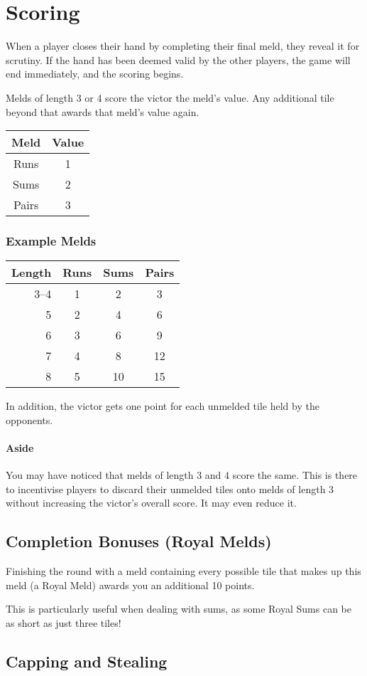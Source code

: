 \section{Scoring}\label{sec:scoring}
When a player closes their hand by completing their final meld, they reveal it for scrutiny. 
If the hand has been deemed valid by the other players, the game will end immediately, and the scoring begins.

Melds of length 3 or 4 score the victor the meld's value. Any additional tile beyond that awards that meld's value again.

\begin{center}
    \begin{tabular}{c|c}
        Meld & Value\\\hline\hline
        Runs & 1\\
        Sums & 2\\
        Pairs & 3\\
    \end{tabular}
\end{center}

\subsubsection*{Example Melds}
\begin{center}
    \begin{tabular}{r|c|c|c}
        Length & Runs & Sums & Pairs\\\hline\hline
        3--4 & 1 &  2 &  3 \\
           5 & 2 &  4 &  6 \\
           6 & 3 &  6 &  9 \\
           7 & 4 &  8 & 12 \\
           8 & 5 & 10 & 15 \\
    \end{tabular}
\end{center}

In addition, the victor gets one point for each unmelded tile held by the opponents.

\paragraph{Aside} You may have noticed that melds of length 3 and 4 score the same. This is there to incentivise players to discard their unmelded tiles onto melds of length 3 without increasing the victor's overall score. It may even reduce it.

\subsection{Completion Bonuses (Royal Melds)}
Finishing the round with a meld containing every possible tile that makes up this meld (a Royal Meld) awards you an additional 10 points.

This is particularly useful when dealing with sums, as some Royal Sums can be as short as just three tiles!

\subsection{Capping and Stealing}